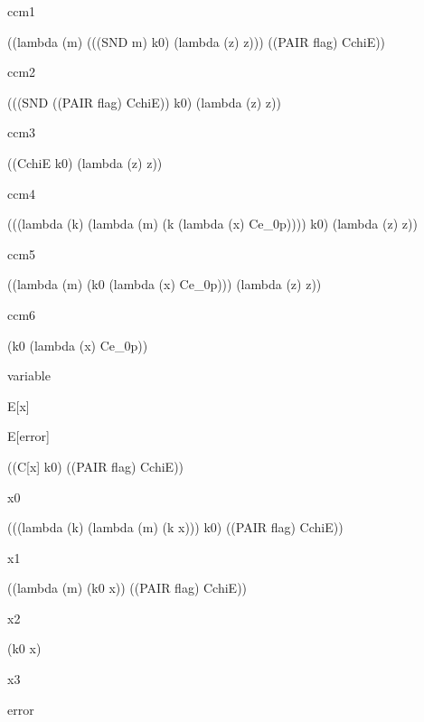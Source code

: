 \documentclass[ms,electronic,twosidetoc,letterpaper,chaptercenter,parttop]{byumsphd}
\begin{document}
\begin{singlespace}
ccm1
\begin{schemedisplay}
((lambda (m) (((SND m) k0) (lambda (z) z))) ((PAIR flag) CchiE))
\end{schemedisplay}

ccm2
\begin{schemedisplay}
(((SND ((PAIR flag) CchiE)) k0) (lambda (z) z))
\end{schemedisplay}

ccm3
\begin{schemedisplay}
((CchiE k0) (lambda (z) z))
\end{schemedisplay}

ccm4
\begin{schemedisplay}
(((lambda (k) (lambda (m) (k (lambda (x) Ce_0p)))) k0) (lambda (z) z))
\end{schemedisplay}

ccm5
\begin{schemedisplay}
((lambda (m) (k0 (lambda (x) Ce_0p))) (lambda (z) z))
\end{schemedisplay}

ccm6
\begin{schemedisplay}
(k0 (lambda (x) Ce_0p))
\end{schemedisplay}

variable
\begin{schemedisplay}
E[x]
\end{schemedisplay}

\begin{schemedisplay}
E[error]
\end{schemedisplay}

\begin{schemedisplay}
((C[x] k0) ((PAIR flag) CchiE))
\end{schemedisplay}

x0
\begin{schemedisplay}
(((lambda (k) (lambda (m) (k x))) k0) ((PAIR flag) CchiE))
\end{schemedisplay}

x1
\begin{schemedisplay}
((lambda (m) (k0 x)) ((PAIR flag) CchiE))
\end{schemedisplay}

x2
\begin{schemedisplay}
(k0 x)
\end{schemedisplay}

x3
\begin{schemedisplay}
error
\end{schemedisplay}


\end{singlespace}
\end{document}
